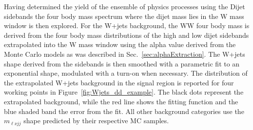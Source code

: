 Having determined the yield of the ensemble of physics processes using
the Dijet sidebands the four body mass spectrum where the dijet mass
lies in the W mass window is then explored.  For the W+jets
background, the WW four body mass is derived from the four body mass
distributions of the high and low dijet sidebands extrapolated into
the W mass window using the alpha value derived from the Monte Carlo
models as was described in Sec.~\ref{sec:alphaExtraction}.  The W+jets
shape derived from the sidebands is then smoothed with a parametric
fit to an exponential shape, modulated with a turn-on when necessary.
The distribution of the extrapolated W+jets background in the signal
region is reported for four working points in
Figure~\ref{fig:Wjets_dd_example}.  The black dots represent the
extrapolated background, while the red line shows the fitting function
and the blue shaded band the error from the fit.  All other background
categories use the $m_{\ell\nu jj}$ shape predicted by their
respective MC samples.
